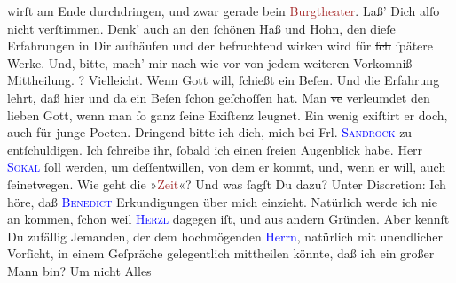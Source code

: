 \documentclass[twoside=false,titlepage=false,open=any, parskip=never, fontsize=12pt, headings=small, chapterprefix=false, appendixprefix=false]{scrbook}
\newcommand{\strikeout}[1]{\sout{#1}}
\newcommand{\pbposition}{\depth}
\newcommand{\pb}{\nobreak\hspace{0pt}\raisebox{-0.1em}{\raisebox{\pbposition}{\textnormal{|}}}\nobreak\hspace{0pt}}
\begin{document}
               wirſt am Ende durchdringen, und zwar gerade bein \textcolor{brown}{Burgtheater}{}\ledrightnote{\textcolor{brown}{Burgtheater}}. Laß’ Dich alſo nicht verſtimmen. Denk’ auch an den ſchönen Haß
               und Hohn, den dieſe Erfahrungen in Dir aufhäufen und der befruchtend wirken wird für
                  \strikeout{ſch} ſpätere Werke. Und, bitte, mach’ mir nach wie
               vor von jedem weiteren Vorkomniß Mittheilung. \label{K_L02622-2v}\label{K_L02622-2h}? {\pb}Vielleicht. Wenn Gott will, ſchießt ein Beſen. Und
               die Erfahrung lehrt, daß hier und da ein Beſen ſchon geſchoſſen hat. Man \strikeout{ve} verleumdet den lieben Gott, wenn man ſo ganz ſeine
               Exiſtenz leugnet. Ein wenig exiſtirt er doch, auch für junge Poeten.\pend
           \pstart
           Dringend bitte ich dich, mich bei Frl. \textsc{\textcolor{blue}{Sandrock}{}\ledrightnote{\textcolor{blue}{Adele Sandrock}}} zu entſchuldigen. Ich ſchreibe ihr, ſobald ich
               einen ſreien Augenblick habe.\pend
           \pstart
           Herr \textsc{\textcolor{blue}{Sokal}{}\ledrightnote{\textcolor{blue}{Clemens Sokal}}} ſoll \label{K_L02622-3v}\label{K_L02622-3h} werden, {\pb}um
               deſſentwillen, von dem er kommt, und, wenn er will, auch ſeinetwegen.\pend
           \pstart
           Wie geht die »\textcolor{brown}{Zeit}{}\ledrightnote{\textcolor{brown}{Die Zeit. Wiener Wochenschrift}}«? Und was ſagſt Du dazu?\pend
           \pstart
           Unter Discretion: Ich höre, daß \textsc{\textcolor{blue}{Benedict}{}\ledrightnote{\textcolor{blue}{Moriz Benedikt}}} Erkundigungen über mich einzieht. Natürlich werde ich nie
               an \label{K_L02622-4v}\label{K_L02622-4h}
               kommen, ſchon weil \textsc{\textcolor{blue}{Herzl}{}\ledrightnote{\textcolor{blue}{Theodor Herzl}}} dagegen iſt, und aus andern Gründen. Aber kennſt Du zufällig
               Jemanden, der dem hochmögenden \textcolor{blue}{Herrn}{}\ledrightnote{\textcolor{blue}{Moriz Benedikt}}, natürlich
               mit unendlicher Vorſicht, in einem Geſpräche gelegentlich mittheilen könnte, {\pb}daß ich ein großer Mann bin? Um nicht Alles
\end{document}
